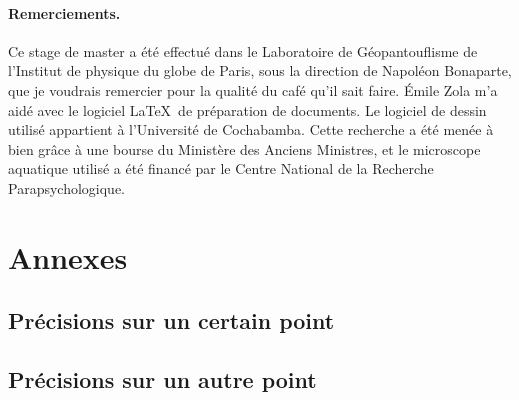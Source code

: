 \documentclass{ipgpmaster}
\begin{document}
\paragraph*{Remerciements.} Ce stage de master a été effectué dans le 
Laboratoire de Géo\-pan\-tou\-flis\-me de 
l'Institut de physique du globe de Paris, sous la direction de Napoléon Bonaparte, 
que je voudrais remercier pour la qualité du café qu'il sait faire. 
Émile Zola m'a aidé avec le logiciel \LaTeX \ de préparation de documents. 
Le logiciel de dessin utilisé appartient à l'Université de Cochabamba.
Cette recherche a été menée à bien grâce à une bourse du 
Ministère des Anciens Ministres, et le microscope aquatique utilisé a 
été financé par le Centre National de la Recherche Parapsychologique. 
 
\newpage


\printbibliography
            
\newpage

\appendix %
\section{Annexes}
 
\subsection{Précisions sur un certain point}
  
\subsection{Précisions sur un autre point}
 
\cleardoublepage
  
\end{document}
